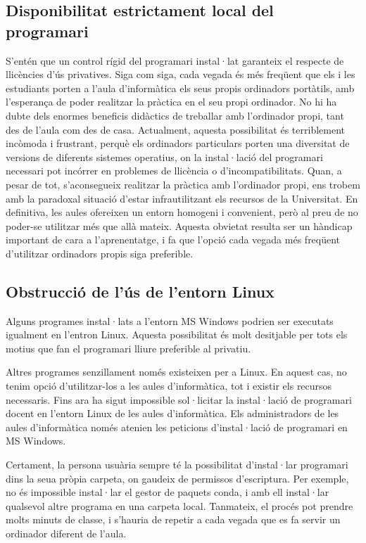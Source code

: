 \documentclass[a4paper,12pt]{article}
\begin{document}
\subsection{Disponibilitat estrictament local del programari}
S'entén que un control rígid del programari instal·lat 
garanteix el respecte de llicències d'ús privatives. Siga com siga, cada vegada és més
freqüent que els i les estudiants porten a l'aula d'informàtica els seus propis ordinadors
portàtils, amb l'esperança de poder realitzar la pràctica en el seu propi ordinador.
No hi ha dubte dels enormes beneficis didàctics de
treballar amb l'ordinador propi, tant des de l'aula com des de casa. Actualment,
aquesta possibilitat és terriblement incòmoda i frustrant, perquè els ordinadors
particulars porten una diversitat de versions de diferents sistemes operatius, on la
instal·lació del programari necessari pot incórrer en problemes de llicència o
d'incompatibilitats. Quan, a pesar de tot, s'aconsegueix realitzar la pràctica amb
l'ordinador propi, ens trobem amb la paradoxal situació d'estar infrautilitzant els
recursos de la Universitat. En definitiva, les aules ofereixen un entorn homogeni i
convenient, però al preu de no poder-se utilitzar més que allà mateix. Aquesta obvietat
resulta ser un hàndicap important de cara a l'aprenentatge, i fa que l'opció cada vegada
més freqüent d'utilitzar ordinadors propis siga preferible.

\subsection{Obstrucció de l'ús de l'entorn Linux}
Alguns programes instal·lats a l'entorn MS Windows podrien ser executats igualment en
l'entron Linux. Aquesta possibilitat és molt desitjable per tots els motius que fan
el programari lliure preferible al privatiu.

Altres programes senzillament només existeixen per a Linux. En aquest cas, no tenim
opció d'utilitzar-los a les aules d'informàtica, tot i existir els recursos necessaris.
Fins ara ha sigut impossible sol·licitar la instal·lació
de programari docent en l'entorn Linux de les aules d'informàtica. Els administradors
de les aules d'informàtica només atenien les peticions d'instal·lació de programari en
MS Windows.

Certament, la persona usuària sempre té la possibilitat d'instal·lar programari dins la seua
pròpia carpeta, on gaudeix de permissos d'escriptura. Per exemple, no és impossible
instal·lar el gestor de paquets \textsf{conda}, i amb ell instal·lar qualsevol altre programa en
una carpeta local. Tanmateix, el procés pot prendre molts minuts de classe, i s'hauria
de repetir a cada vegada que es fa servir un ordinador diferent de l'aula.
\end{document}
